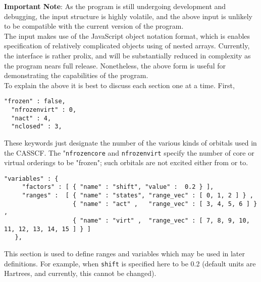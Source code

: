 \noindent \textbf{Important Note}: As the program is still undergoing development and debugging, 
the input structure is highly volatile, and the above input is unlikely to be compatible with
the current version of the program.\\

\noindent The input makes use of the JavaScript object notation\cite{JSON} format, which 
is enables specification of relatively complicated objects using of nested arrays.
Currently, the interface is rather prolix, and will be substantially reduced in complexity
as the program nears full release. Nonetheless, the above form is useful for demonstrating the capabilities
of the program.\\

\noindent To explain the above it is best to discuss each section one at a time. First,
\begin{lstlisting}[label={lst:casscf}]
  "frozen" : false,
  "nfrozenvirt" : 0,
  "nact" : 4,
  "nclosed" : 3,
\end{lstlisting}         
\noindent These keywords just designate the number of the various kinds of orbitals used in the CASSCF.
The "\texttt{nfrozencore} and \texttt{nfrozenvirt} specify the number of core or virtual orderings to be "frozen";
such orbitals are not excited either from or to.\\

\begin{lstlisting}[label={lst:variables}]
  "variables" : {
     "factors" : [ { "name" : "shift", "value" :  0.2 } ],
     "ranges" :  [ { "name" : "states", "range_vec" : [ 0, 1, 2 ] } ,
                   { "name" : "act" ,   "range_vec" : [ 3, 4, 5, 6 ] } ,
                   { "name" : "virt" ,  "range_vec" : [ 7, 8, 9, 10, 11, 12, 13, 14, 15 ] } ]
   },
\end{lstlisting}         
\noindent This section is used to define ranges and variables which may be used in later definitions. For example,
when \texttt{shift} is specified here to be 0.2 (default units are Hartrees, and currently, this cannot be 
changed). 

